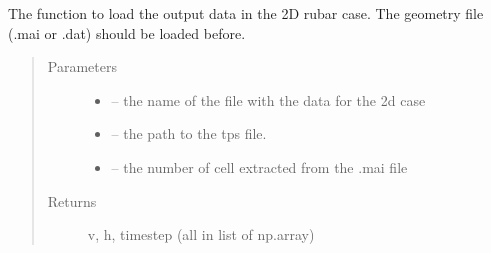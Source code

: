 \documentclass[letterpaper,10pt,english]{sphinxmanual}
\begin{document}

\begin{fulllineitems}
\label{\detokenize{index:src.rubar.load_tps_2d}}
The function to load the output data in the 2D rubar case. The geometry file (.mai or .dat) should be loaded before.
\begin{quote}\begin{description}
\item[{Parameters}] \leavevmode\begin{itemize}
\item {} 
 -- the name of the file with the data for the 2d case

\item {} 
 -- the path to the tps file.

\item {} 
 -- the number of cell extracted from the .mai file

\end{itemize}

\item[{Returns}] \leavevmode
v, h, timestep (all in list of np.array)

\end{description}\end{quote}

\end{fulllineitems}

\end{document}

